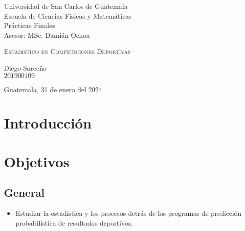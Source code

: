 \begin{titlepage}


\begin{flushleft}
    Universidad de San Carlos de Guatemala \\
    Escuela de Ciencias Físicas y Matemáticas \\
    Prácticas Finales \\
    Asesor: MSc. Damián Ochoa
\end{flushleft}

\vspace{7.5cm}

\begin{center}
    \huge{\textsc{Estadístico en Competiciones Deportivas}} \\[1cm]
\end{center}

\vspace{7.5cm}

\begin{flushright}
    Diego Sarceño \\
    $201900109$
\end{flushright}

\vspace{1cm}

\begin{center}
    Guatemala, 31 de enero del 2024
\end{center}

\end{titlepage}



%


\section{Introducción}





\section{Objetivos}
\subsection{General}
\begin{itemize}
	\item Estudiar la estadística y los procesos detrás de los programas de predicción probabilística de resultados deportivos.
\end{itemize}

